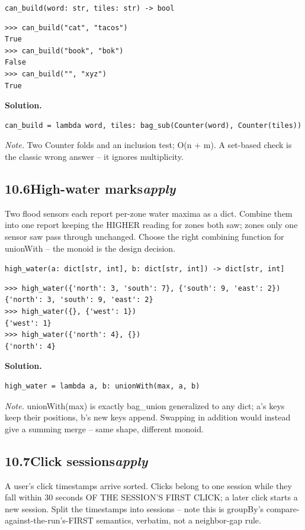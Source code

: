 \documentclass[10pt,letterpaper]{book}
\begin{document}
\noindent\texttt{can\_build(word: str, tiles: str) -> bool}
\begin{lstlisting}[style=ex]
>>> can_build("cat", "tacos")
True
>>> can_build("book", "bok")
False
>>> can_build("", "xyz")
True
\end{lstlisting}
\noindent\textbf{Solution.}
\begin{lstlisting}[style=code]
can_build = lambda word, tiles: bag_sub(Counter(word), Counter(tiles))
\end{lstlisting}
\noindent\textit{Note.} Two Counter folds and an inclusion test; O(n + m). A set-based check is the classic wrong answer -- it ignores multiplicity.

\subsection*{10.6\quad High-water marks\hfill\textnormal{\textit{apply}}}
Two flood sensors each report per-zone water maxima as a dict. Combine them into one report keeping the HIGHER reading for zones both saw; zones only one sensor saw pass through unchanged. Choose the right combining function for unionWith -- the monoid is the design decision.

\noindent\texttt{high\_water(a: dict[str, int], b: dict[str, int]) -> dict[str, int]}
\begin{lstlisting}[style=ex]
>>> high_water({'north': 3, 'south': 7}, {'south': 9, 'east': 2})
{'north': 3, 'south': 9, 'east': 2}
>>> high_water({}, {'west': 1})
{'west': 1}
>>> high_water({'north': 4}, {})
{'north': 4}
\end{lstlisting}
\noindent\textbf{Solution.}
\begin{lstlisting}[style=code]
high_water = lambda a, b: unionWith(max, a, b)
\end{lstlisting}
\noindent\textit{Note.} unionWith(max) is exactly bag\_union generalized to any dict; a's keys keep their positions, b's new keys append. Swapping in addition would instead give a summing merge -- same shape, different monoid.

\subsection*{10.7\quad Click sessions\hfill\textnormal{\textit{apply}}}
A user's click timestamps arrive sorted. Clicks belong to one session while they fall within 30 seconds OF THE SESSION'S FIRST CLICK; a later click starts a new session. Split the timestamps into sessions -- note this is groupBy's compare-against-the-run's-FIRST semantics, verbatim, not a neighbor-gap rule.
\end{document}
